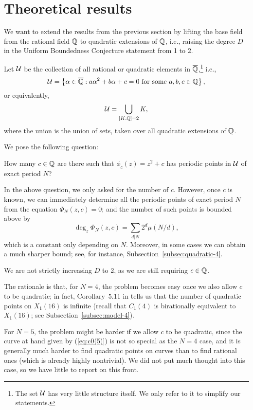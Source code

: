 \section{Theoretical results}
\label{sec:th}

We want to extend the results from the previous section by lifting the
base field from the rational field $\mathbb{Q}$ to quadratic extensions of
$\mathbb{Q}$, i.e., raising the degree $D$ in the Uniform Boundedness
Conjecture statement from 1 to 2.

Let $\mathcal{U}$ be the collection of all rational or quadratic elements in
$\overline{\mathbb{Q}}$,\footnote{%
  The set $\mathcal{U}$ has very little structure itself. We only refer to it
  to simplify our statements.}
i.e.,
\[
\mathcal{U} = \left\{\alpha \in \overline{\mathbb{Q}}: \text{$a \alpha^2 + b \alpha + c = 0$
    for some $a, b, c \in \mathbb{Q}$}\right\},
\]
or equivalently,
\[
\mathcal{U} = \bigcup_{[K : \mathbb{Q}] = 2}K,
\]
where the union is the union of sets, taken over all quadratic
extensions of $\mathbb{Q}$.

We pose the following question:

\begin{question}
  \label{question}
  How many $c \in \mathbb{Q}$ are there such that $\phi_c(z) = z^2 + c$ has
  periodic points in $\mathcal{U}$ of exact period $N$?
\end{question}

\begin{remark}
  In the above question, we only asked for the number of $c$. However,
  once $c$ is known, we can immediately determine all the periodic
  points of exact period $N$ from the equation $\Phi_N(z, c) = 0$; and
  the number of such points is bounded above by
  \[
  \deg_z \Phi_N(z, c) = \sum_{d|N}2^d \mu(N/d),
  \]
  which is a constant only depending on $N$. Moreover, in some cases
  we can obtain a much sharper bound; see, for instance,
  Subsection~\ref{subsec:quadratic-4}.
\end{remark}

\begin{remark}
  We are not strictly increasing $D$ to 2, as we are still requiring
  $c \in \mathbb{Q}$.

  The rationale is that, for $N = 4$, the problem becomes easy once we
  also allow $c$ to be quadratic; in fact, Corollary~5.11 in
  \cite{2013arXiv1308.3267B} tells us that the number of quadratic
  points on $X_1(16)$ is infinite (recall that $C_1(4)$ is
  birationally equivalent to $X_1(16)$; see
  Subsection~\ref{subsec:model-4}).

  For $N = 5$, the problem might be harder if we allow $c$ to be
  quadratic, since the curve at hand given by (\ref{eq:c0(5)}) is not
  so special as the $N = 4$ case, and it is generally much harder to
  find quadratic points on curves than to find rational ones (which is
  already highly nontrivial). We did not put much thought into this
  case, so we have little to report on this front.
\end{remark}

